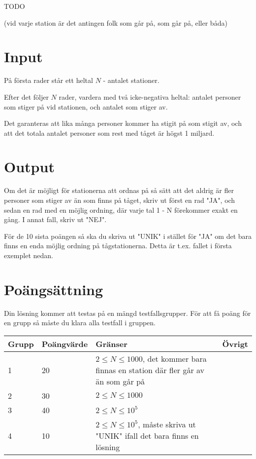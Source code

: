 
TODO

(vid varje station är det antingen folk som går på, som går på, eller båda)

\section*{Input}
På första rader står ett heltal $N$ - antalet stationer.

Efter det följer $N$ rader, vardera med två icke-negativa heltal: antalet personer som stiger på vid stationen, och antalet som stiger av.

Det garanteras att lika många personer kommer ha stigit på som stigit av, och att det totala antalet personer som rest med tåget är högst 1 miljard.

\section*{Output}
Om det är möjligt för stationerna att ordnas på så sätt att det aldrig är fler personer som stiger av än som finns på tåget, skriv ut först en rad "JA", och sedan en rad med en möjlig ordning, där varje tal 1 - N förekommer exakt en gång.
I annat fall, skriv ut "NEJ".

För de 10 sista poängen så ska du skriva ut "UNIK" i stället för "JA" om det bara finns en enda möjlig ordning på tågstationerna. Detta är t.ex. fallet i första exemplet nedan.

\section*{Poängsättning}
Din lösning kommer att testas på en mängd testfallsgrupper. För att få poäng för en grupp så måste du klara alla testfall i gruppen.

\begin{tabular}{| l | l | l | l |}
\hline
Grupp & Poängvärde & Gränser & Övrigt\\ \hline
1     & 20         & $ 2 \le N \le 1000 $, det kommer bara finnas en station där fler går av än som går på & \\ \hline
2     & 30         & $ 2 \le N \le 1000 $ & \\ \hline
3     & 40         & $ 2 \le N \le 10^5 $ & \\ \hline
4     & 10         & $ 2 \le N \le 10^5 $, måste skriva ut "UNIK" ifall det bara finns en lösning & \\ \hline
\end{tabular}

